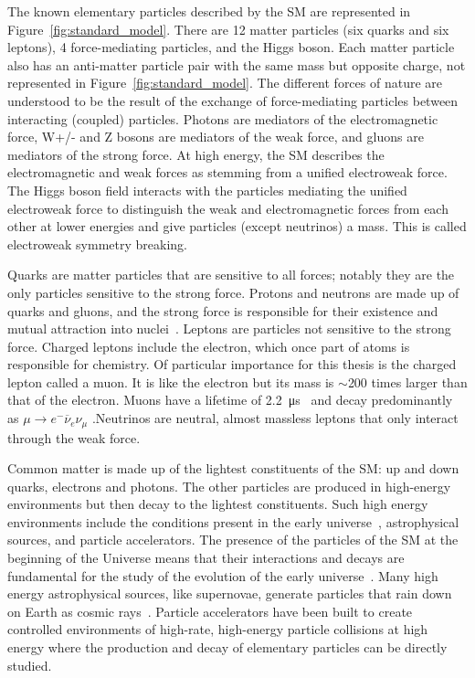 The known elementary particles described by the SM are represented in Figure~\ref{fig:standard_model}.  There are 12 matter particles (six quarks and six leptons), 4 force-mediating particles, and the Higgs boson. Each matter particle also has an anti-matter particle pair with the same mass but opposite charge, not represented in Figure~\ref{fig:standard_model}. The different forces of nature are understood to be the result of the exchange of force-mediating particles between interacting (coupled) particles. Photons are mediators of the electromagnetic force, W+/- and Z bosons are mediators of the weak force, and gluons are mediators of the strong force. At high energy, the SM describes the electromagnetic and weak forces as stemming from a unified electroweak force. The Higgs boson field interacts with the particles mediating the unified electroweak force to distinguish the weak and electromagnetic forces from each other at lower energies and give particles (except neutrinos) a mass. This is called electroweak symmetry breaking. 

Quarks are matter particles that are sensitive to all forces; notably they are the only particles sensitive to the strong force. Protons and neutrons are made up of quarks and gluons, and the strong force is responsible for their existence and mutual attraction into nuclei~\cite{bertulani_nuclear_2007}. Leptons are particles not sensitive to the strong force. Charged leptons include the electron, which once part of atoms is responsible for chemistry. Of particular importance for this thesis is the charged lepton called a muon. It is like the electron but its mass is $\sim$200 times larger than that of the electron. Muons have a lifetime of \SI{2.2}{\micro\second}~\cite{zyla_review_2020} and decay predominantly as $\mu \rightarrow e^{-}\overline{\nu}_{e}\nu_{\mu}$ .Neutrinos are neutral, almost massless leptons that only interact through the weak force. 

Common matter is made up of the lightest constituents of the SM: up and down quarks, electrons and photons. The other particles are produced in high-energy environments but then decay to the lightest constituents. Such high energy environments include the conditions present in the early universe~\cite{carroll_introduction_2007}, astrophysical sources, and particle accelerators. The presence of the particles of the SM at the beginning of the Universe means that their interactions and decays are fundamental for the study of the evolution of the early universe~\cite{carroll_introduction_2007}. Many high energy astrophysical sources, like supernovae, generate particles that rain down on Earth as cosmic rays~\cite{boezio_chemical_2012}. Particle accelerators have been built to create controlled environments of high-rate, high-energy particle collisions at high energy where the production and decay of elementary particles can be directly studied.


